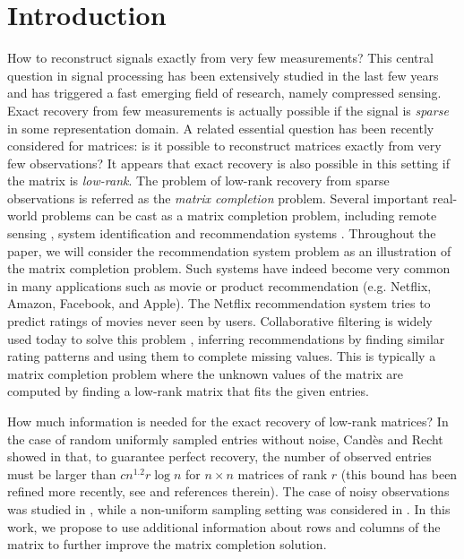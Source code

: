 \documentclass{article}
\begin{document}
\section{Introduction}
\vspace{-0.2cm}
How to reconstruct signals exactly from very few measurements? This central question in signal processing has been extensively studied in the last few years and has triggered a fast emerging field of research, namely compressed sensing. Exact recovery from few measurements is actually possible if the signal is {\it sparse} in some representation domain. A related essential question has been recently considered for matrices: is it possible to reconstruct matrices exactly from very few observations? It appears that exact recovery is also possible in this setting if the matrix is {\it low-rank}. The problem of low-rank recovery from sparse observations is referred as the {\it matrix completion} problem. Several important real-world problems can be cast as a matrix completion problem, including remote sensing \cite{art:Schmidt86RemoteSensing}, system identification \cite{art:LiuVandenberghe09SysIden} and recommendation systems \cite{srebro2004maximum}. Throughout the paper, we will consider the recommendation system problem as an illustration of the matrix completion problem.
Such systems have indeed become very common in many applications such as movie or product recommendation (e.g. Netflix, Amazon, Facebook, and Apple). 
The Netflix recommendation system tries to predict ratings of movies never seen by users. Collaborative filtering is widely used today to solve this problem \cite{breese1998empirical}, inferring recommendations by finding similar rating patterns and using them to complete missing values. This is typically a matrix completion problem where the unknown values of the matrix are computed by finding a low-rank matrix that fits the given entries.

How much information is needed for the exact recovery of low-rank matrices? 
In the case of random uniformly sampled entries without noise, Cand{\`e}s and Recht showed in \cite{candes2009exact} that, to guarantee perfect recovery, the number of observed entries must be larger than $c n^{1.2}r\log n$ for $n\times n$ matrices of rank $r$ (this bound has been refined more recently, see \cite{recht2011simpler} and references therein). 
The case of noisy observations was studied in \cite{candes2010matrix,negahban2012restricted}, while a non-uniform sampling setting was considered in \cite{salakhutdinov2010collaborative}. 
In this work, we propose to use additional information about rows and columns of the matrix to further improve the matrix completion solution.
\end{document}
